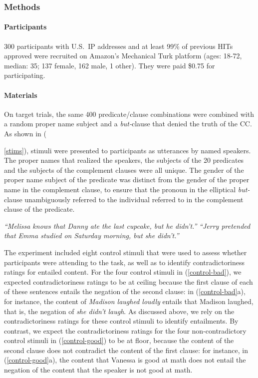 \documentclass[11pt,fleqn]{article}
\newcommand{\6}{\mbox{$[\hspace*{-.6mm}[$}}
\newcommand{\9}{\mbox{$]\hspace*{-.6mm}]$}}
\begin{document}
\subsubsection{Methods}

\paragraph{Participants} 300 participants with U.S.\ IP addresses and at least 99\% of previous HITs approved were recruited on Amazon's Mechanical Turk platform (ages: 18-72, median: 35; 137 female, 162 male, 1 other). They were paid \$0.75 for participating.

\paragraph{Materials} On target trials, the same 400 predicate/clause combinations were combined with a random proper name subject and a {\em but-}clause that denied the truth of the CC. As shown in ({\ref{stims}), stimuli were presented to participants as utterances by named speakers. The proper names that realized the speakers, the subjects of the 20 predicates and the subjects of the complement clauses were all unique. The gender of the proper name subject of the predicate was distinct from the gender of the proper name in the complement clause, to ensure that the pronoun in the elliptical {\em but-}clause unambiguously referred to the individual referred to in the complement clause of the predicate.

\begin{exe}
\ex\label{stims}
\begin{xlist}
 {\em ``Melissa knows that Danny ate the last cupcake, but he didn't.''}
 {\em ``Jerry pretended that Emma studied on Saturday morning, but she didn't.''}
\end{xlist}
\end{exe}

The experiment  included eight control stimuli that were used to assess whether participants were attending to the task, as well as to identify contradictoriness ratings for entailed content. For the four control stimuli in (\ref{control-bad}), we expected contradictoriness ratings to be at ceiling because the first clause of each of these sentences entails the negation of the second clause: in (\ref{control-bad}a), for instance, the content of {\em Madison laughed loudly} entails that Madison laughed, that is, the negation of {\em she didn't laugh}. As discussed above, we rely on the contradictoriness ratings for these control stimuli to identify entailments. By contrast, we expect the contradictoriness ratings for the four non-contradictory control stimuli in (\ref{control-good}) to be at floor, because the content of the second clause does not contradict the content of the first clause: for instance, in (\ref{control-good}a), the content that Vanessa is good at math does not entail the negation of the content that the speaker is not good at math. 

}
\end{document}
